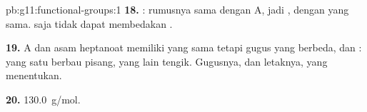 \begin{solution}{pb:g11:functional-groups:1}
\textbf{18.} : rumusnya sama dengan A, jadi , dengan
 yang sama.  saja tidak dapat membedakan
.

\textbf{19.} A dan asam heptanoat memiliki  yang sama tetapi
gugus yang berbeda,  dan : yang satu berbau pisang,
yang lain tengik. Gugusnya, dan letaknya, yang menentukan.

\textbf{20.} \qty{130.0}{g/mol}.
\end{solution}
